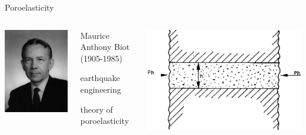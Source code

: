\documentclass[xcolor=table]{beamer}
\begin{document}
\begin{frame}{Poroelasticity}
\begin{columns}
\includegraphics[width=\textwidth]{Maurice_Anthony_Biot}
\begin{block}{Maurice Anthony Biot (1905-1985)}
\begin{description}[1803]
\item[1932-1942] earthquake engineering
\item[1935-1962] theory of poroelasticity
\end{description}
\end{block}
\includegraphics[width=\textwidth]{Biot_1964_Buckling_Porous}
\end{columns}


\end{frame}
\end{document}
